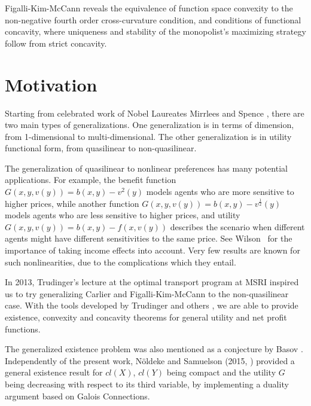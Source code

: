 Figalli-Kim-McCann \cite{FigalliKimMcCann11} reveals the equivalence of function space convexity to the non-negative fourth order cross-curvature condition, and conditions of functional concavity, where uniqueness and stability of the monopolist's maximizing strategy follow from strict concavity.\medskip



\section{Motivation}

Starting from celebrated work of Nobel Laureates Mirrlees \cite{Mirrlees71} and Spence \cite{Spence74}, there are two main types of generalizations. One generalization is in terms of dimension, from 1-dimensional to multi-dimensional. The other generalization is in utility functional form, from quasilinear to non-quasilinear.\medskip

The generalization of quasilinear to nonlinear preferences has many potential applications. For example, the benefit function $G(x,y,v(y))=b(x,y) -v^2(y)$ models agents who are more sensitive to higher prices, while another function $G(x,y,v(y))=b(x,y)-v^{\frac{1}{2}}(y)$ models agents who are less sensitive to higher prices, and utility $G(x,y,v(y))=b(x,y) -f(x, v(y))$ describes the scenario when different agents might have different sensitivities to the same price. See Wilson~\cite[Chapter 7]{Wilson93} for the importance of taking income effects into account. 
Very few results are known for such nonlinearities,  due to the complications which they entail. \medskip


	In 2013, Trudinger's lecture at the optimal transport program at MSRI inspired us to try generalizing Carlier \cite{Carlier01} and Figalli-Kim-McCann \cite{FigalliKimMcCann11} to the non-quasilinear case. With the tools developed by Trudinger \cite{Trudinger14} and others  \cite{Balder77,Singer97}, we are able to provide existence, convexity and concavity theorems for general utility and net profit functions. \medskip

	The generalized existence problem was also mentioned as a conjecture by Basov \cite[Chapter 8]{Basov05}. 
	Independently of the present work, N\"oldeke and Samuelson (2015, \cite{NoldekeSamuelson15p}) provided a general existence result for $cl(X)$, $cl(Y)$ being compact and the utility $G$ being decreasing with respect to its third variable, by implementing a duality argument based on Galois Connections. \medskip



